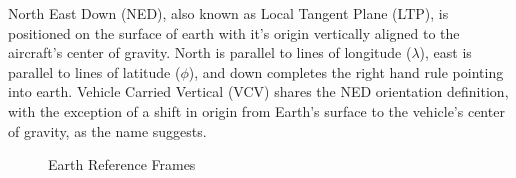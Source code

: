 \documentclass[12pt]{ucthesis}
\begin{document}
North East Down (NED), also known as Local Tangent Plane (LTP), is positioned on the surface of earth with it's origin vertically aligned to the aircraft's center of gravity. North is parallel to lines of longitude ($\lambda$), east is parallel to lines of latitude ($\phi$), and down completes the right hand rule pointing into earth. Vehicle Carried Vertical (VCV) shares the NED orientation definition, with the exception of a shift in origin from Earth's surface to the vehicle's center of gravity, as the name suggests. 
%
	\begin{figure}[htb]
	  \centering
	  \caption{Earth Reference Frames}
	  \label{fig: ref_frames}
	\end{figure}
\end{document}
